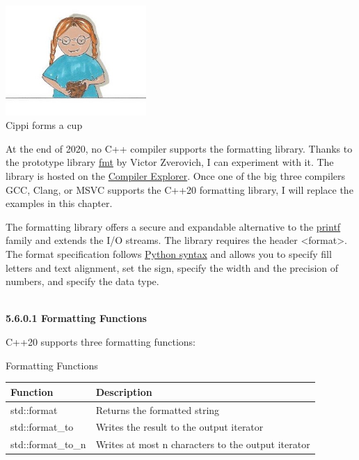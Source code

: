 \begin{center}
\includegraphics[width=0.4\textwidth]{content/3/chapter5/images/29.png}\\
Cippi forms a cup
\end{center}

\begin{tcolorbox}[breakable,enhanced jigsaw,colback=blue!5!white,colframe=blue!75!black,title={Lack of Compiler Support}]
	
At the end of 2020, no C++ compiler supports the formatting library. Thanks to the prototype library \href{https://github.com/fmtlib/fmt}{fmt} by Victor Zverovich, I can experiment with it. The library is hosted on the \href{https://godbolt.org/z/Eq5763}{Compiler Explorer}. Once one of the big three compilers GCC, Clang, or MSVC supports the C++20 formatting library, I will replace the examples in this chapter.
	
\end{tcolorbox}

The formatting library offers a secure and expandable alternative to the \href{https://en.cppreference.com/w/cpp/io/c/fprintf}{printf} family and extends the I/O streams. The library requires the header <format>. The format specification follows \href{https://docs.python.org/3/library/stdtypes.html#str.format}{Python syntax} and allows you to specify fill letters and text alignment, set the sign, specify the width and the precision of numbers, and specify the data type.


\hspace*{\fill} \\ %
\noindent
\textbf{5.6.0.1\hspace{0.2cm} Formatting Functions}

C++20 supports three formatting functions:

\begin{center}
Formatting Functions
\end{center}

\begin{table}[H]
\centering
\begin{tabular}{ll}
\textbf{Function}  & \textbf{Description}                               \\ \hline
std::format        & Returns the formatted string                       \\
std::format\_to    & Writes the result to the output iterator           \\
std::format\_to\_n & Writes at most n characters to the output iterator
\end{tabular}
\end{table}

